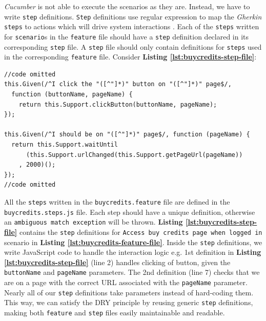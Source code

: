\textit{Cucumber} is not able to execute the scenarios as they are. Instead, we have to write \texttt{step} definitions. \texttt{Step} definitions use regular expression to map the \textit{Gherkin} \texttt{steps} to actions which will drive system interactions \cite{stepfile1}. Each of the \texttt{steps} written for \texttt{scenario}s in the \texttt{feature} file should have a \texttt{step} definition declared in its corresponding \texttt{step} file. A \texttt{step} file should only contain definitions for \texttt{steps} used in the corresponding \texttt{feature} file. Consider \textbf{Listing \ref{lst:buycredits-step-file}}:\\

\begin{listing}[H]
\begin{verbatim}
//code omitted
this.Given(/^I click the "([^"]*)" button on "([^"]*)" page$/,
  function (buttonName, pageName) {
    return this.Support.clickButton(buttonName, pageName);
});

this.Given(/^I should be on "([^"]*)" page$/, function (pageName) {
  return this.Support.waitUntil
      (this.Support.urlChanged(this.Support.getPageUrl(pageName))
    , 2000)();
});
//code omitted
\end{verbatim}
\label{lst:buycredits-step-file}
\end{listing}

All the \texttt{steps} written in the \texttt{buycredits.feature} file are defined in the \texttt{buycredits.steps.js} file. Each step should have a unique definition, otherwise an \texttt{ambiguous match exception} will be thrown. \textbf{Listing \ref{lst:buycredits-step-file}} contains the \texttt{step} definitions for \texttt{Access buy credits page when logged in} scenario in \textbf{Listing \ref{lst:buycredits-feature-file}}. Inside the \texttt{step} definitions, we write JavaScript code to handle the interaction logic e.g. 1st definition in \textbf{Listing \ref{lst:buycredits-step-file}} (line 2) handles clicking of button, given the \texttt{buttonName} and \texttt{pageName} parameters. The 2nd definition (line 7) checks that we are on a page with the correct URL associated with the \texttt{pageName} parameter. Nearly all of our \texttt{step} definitions take parameters instead of hard-coding them. This way, we can satisfy the DRY principle by reusing generic \texttt{step} definitions, making both  \texttt{feature} and  \texttt{step} files easily maintainable and readable.

